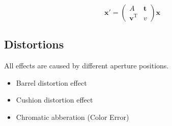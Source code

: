 \[
\mathbf{x}' = 
\begin{pmatrix}
A & \mathbf{t} \\
\mathbf{v}^\mathrm{T} & v
\end{pmatrix}
\mathbf{x}
\]

\subsection{Distortions}
All effects are caused by different aperture
positions.
\begin{itemize}
    \item Barrel distortion effect
    \item Cushion distortion effect
    \item Chromatic abberation (Color Error)
\end{itemize}